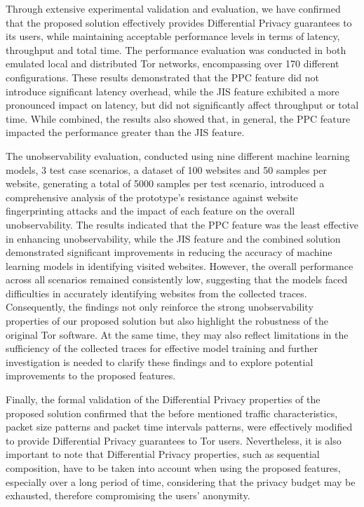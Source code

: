 Through extensive experimental validation and evaluation, we have confirmed that the proposed solution effectively provides Differential Privacy guarantees to its users, while maintaining acceptable performance levels in terms of latency, throughput and total time. The performance evaluation was conducted in both emulated local and distributed Tor networks, encompassing over 170 different configurations. These results demonstrated that the PPC feature did not introduce significant latency overhead, while the JIS feature exhibited a more pronounced impact on latency, but did not significantly affect throughput or total time. While combined, the results also showed that, in general, the PPC feature impacted the performance greater than the JIS feature. 

The unobservability evaluation, conducted using nine different machine learning models, 3 test case scenarios, a dataset of 100 websites and 50 samples per website, generating a total of 5000 samples per test scenario, introduced a comprehensive analysis of the prototype's resistance against website fingerprinting attacks and the impact of each feature on the overall unobservability. The results indicated that the PPC feature was the least effective in enhancing unobservability, while the JIS feature and the combined solution demonstrated significant improvements in reducing the accuracy of machine learning models in identifying visited websites. However, the overall performance across all scenarios remained consistently low, suggesting that the models faced difficulties in accurately identifying websites from the collected traces. Consequently, the findings not only reinforce the strong unobservability properties of our proposed solution but also highlight the robustness of the original Tor software. At the same time, they may also reflect limitations in the sufficiency of the collected traces for effective model training and further investigation is needed to clarify these findings and to explore potential improvements to the proposed features. 

Finally, the formal validation of the Differential Privacy properties of the proposed solution confirmed that the before mentioned traffic characteristics, packet size patterns and packet time intervals patterns, were effectively modified to provide Differential Privacy guarantees to Tor users. Nevertheless, it is also important to note that Differential Privacy properties, such as sequential composition, have to be taken into account when using the proposed features, especially over a long period of time, considering that the privacy budget may be exhausted, therefore compromising the users' anonymity.

